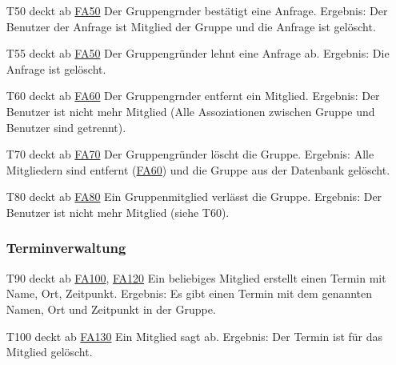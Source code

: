 \documentclass{scrartcl}
\begin{document}
\begin{itemize}
	\item[T50] deckt ab \hyperlink{FA50}{FA50}  \newline
	Der Gruppengrnder bestätigt eine Anfrage. \newline
	Ergebnis: Der Benutzer der Anfrage ist Mitglied der Gruppe und die Anfrage ist gelöscht.
	
	\item[T55] deckt ab \hyperlink{FA50}{FA50}  \newline
	Der Gruppengründer lehnt eine Anfrage ab. \newline
	Ergebnis: Die Anfrage ist gelöscht.
	
	\item[T60] deckt ab \hyperlink{FA60}{FA60}  \newline
	Der Gruppengrnder entfernt ein Mitglied.  \newline
	Ergebnis: Der Benutzer ist nicht mehr Mitglied (Alle Assoziationen zwischen Gruppe und Benutzer sind getrennt).
	
	\item[T70] deckt ab \hyperlink{FA70}{FA70}  \newline
	Der Gruppengründer löscht die Gruppe.  \newline
	Ergebnis: Alle Mitgliedern sind entfernt (\hyperlink{FA60}{FA60}) und die Gruppe aus der Datenbank gelöscht.
	
	\item[T80] deckt ab \hyperlink{FA80}{FA80}  \newline
	Ein Gruppenmitglied verlässt die Gruppe.  \newline
	Ergebnis: Der Benutzer ist nicht mehr Mitglied (siehe T60).
	
	\subsubsection{Terminverwaltung}
	
	\item[T90] deckt ab \hyperlink{FA100}{FA100}, \hyperlink{FA120}{FA120}  \newline
	Ein beliebiges Mitglied erstellt einen Termin mit Name, Ort, Zeitpunkt.  \newline
	Ergebnis: Es gibt einen Termin mit dem genannten Namen, Ort und Zeitpunkt in der Gruppe.
	
	\item [T100] deckt ab \hyperlink{FA130}{FA130}  \newline
	Ein Mitglied sagt ab.  \newline
	Ergebnis: Der Termin ist für das Mitglied gelöscht.
	

\end{itemize}
\end{document}
